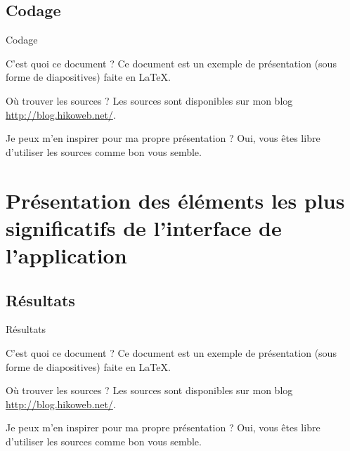 \documentclass[utf8,compress]{beamer}
\begin{document}
\subsection{Codage}
\begin{frame}{Codage}
\begin{block}{C'est quoi ce document ?}
    Ce document est un exemple de présentation (sous forme de diapositives) faite en LaTeX.
\end{block}
\begin{block}{Où trouver les sources ?}
    Les sources sont disponibles sur mon blog \url{http://blog.hikoweb.net/}.
\end{block}
\begin{block}{Je peux m'en inspirer pour ma propre présentation ?}
    Oui, vous êtes libre d'utiliser les sources comme bon vous semble.
\end{block}
\end{frame}

\section{Présentation des éléments les plus significatifs de l’interface de l’application}
\subsection{Résultats}
\begin{frame}{Résultats}
\begin{block}{C'est quoi ce document ?}
    Ce document est un exemple de présentation (sous forme de diapositives) faite en LaTeX.
\end{block}
\begin{block}{Où trouver les sources ?}
    Les sources sont disponibles sur mon blog \url{http://blog.hikoweb.net/}.
\end{block}
\begin{block}{Je peux m'en inspirer pour ma propre présentation ?}
    Oui, vous êtes libre d'utiliser les sources comme bon vous semble.
\end{block}
\end{frame}
\end{document}
